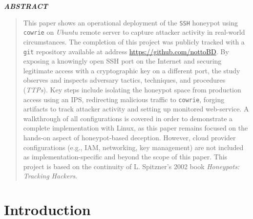 \documentclass{cls/ULBreport}
\renewenvironment{abstract}{%
  \clearpage
  \thispagestyle{plain}
  \begin{center}
    \bfseries\itshape ABSTRACT
  \end{center}
  \vspace{0.5cm}
  \begin{quote}
    \itshape
    \justifying
}{%
  \end{quote}
  \clearpage
}
\begin{document}
    
    \renewcommand{\rmdefault}{cmr} %
    \renewcommand{\sfdefault}{cmss} %
    \renewcommand{\ttdefault}{cmtt} %
    
    \makeatletter
    \renewcommand{\reset@font}{\normalfont\@setfontsize\f@size{12}{14.4}}
    \makeatother
    \normalfont


    \begin{abstract}        
    This paper shows an operational deployment of the \texttt{SSH} honeypot using \texttt{cowrie} on \textit{Ubuntu} remote server to capture attacker activity in real-world circumstances. The completion of this project was publicly tracked with a \texttt{git} repository available at address \href{https://github.com/nottoBD/netsec-honeypot}{https://github.com/nottoBD}. By exposing a knowingly open SSH port on the Internet and securing legitimate access with a cryptographic key on a different port, the study observes and inspects adversary tactics, techniques, and procedures (\textit{TTPs}). Key steps include isolating the honeypot space from production access using an IPS, redirecting malicious traffic to \texttt{cowrie}, forging artifacts to track attacker activity and setting up monitored web-service. A walkthrough of all configurations is covered in order to demonstrate a complete implementation with Linux, as this paper remains focused on the hands-on aspect of honeypot-based deception. However, cloud provider configurations (e.g., IAM, networking, key management) are not included as implementation-specific and beyond the scope of this paper. This project is based on the continuity of L. Spitzner's 2002 book \textit{Honeypots: Tracking Hackers}.
    \end{abstract}
    \newpage


    \section{Introduction}
\end{document}
